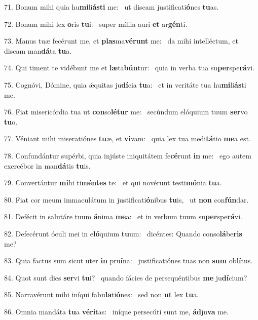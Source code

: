 71. Bonum mihi quia hu\textbf{mi}li\textbf{ás}\textbf{ti} me: \ast\  ut discam justificati\textbf{ó}nes \textbf{tu}as.\

72. Bonum mihi lex \textbf{o}ris \textbf{tu}i: \ast\  super míllia auri \textbf{et} ar\textbf{gén}ti.\

73. Manus tuæ fecérunt me, et \textbf{plas}ma\textbf{vé}\textbf{runt} me: \ast\  da mihi intelléctum, et discam man\textbf{dá}ta \textbf{tu}a.\

74. Qui timent te vidébunt me et \textbf{læ}ta\textbf{bún}tur: \ast\  quia in verba tua su\textbf{per}spe\textbf{rá}vi.\

75. Cognóvi, Dómine, quia ǽquitas ju\textbf{dí}cia \textbf{tu}a: \ast\  et in veritáte tua hu\textbf{mi}li\textbf{ás}ti me.\

76. Fiat misericórdia tua ut \textbf{con}so\textbf{lé}\textbf{tur} me: \ast\  secúndum elóquium tuum \textbf{ser}vo \textbf{tu}o.\

77. Véniant mihi miseratiónes \textbf{tu}æ, et \textbf{vi}vam: \ast\  quia lex tua medi\textbf{tá}tio \textbf{me}a est.\

78. Confundántur supérbi, quia injúste iniquitátem fe\textbf{cé}runt \textbf{in} me: \ast\  ego autem exercébor in man\textbf{dá}tis \textbf{tu}is.\

79. Convertántur \textbf{mi}hi ti\textbf{mén}\textbf{tes} te: \ast\  et qui novérunt testi\textbf{mó}nia \textbf{tu}a.\

80. Fiat cor meum immaculátum in justificati\textbf{ó}nibus \textbf{tu}is, \ast\  ut \textbf{non} con\textbf{fún}dar.\

81. Defécit in salutáre tuum \textbf{á}nima \textbf{me}a: \ast\  et in verbum tuum su\textbf{per}spe\textbf{rá}vi.\

82. Defecérunt óculi mei in e\textbf{ló}quium \textbf{tu}um: \ast\  dicéntes: Quando conso\textbf{lá}be\textbf{ris} me?\

83. Quia factus sum sicut uter \textbf{in} pru\textbf{í}na: \ast\  justificatiónes tuas non \textbf{sum} ob\textbf{lí}tus.\

84. Quot sunt dies \textbf{ser}vi \textbf{tu}i? \ast\  quando fácies de persequéntibus \textbf{me} ju\textbf{dí}cium?\

85. Narravérunt mihi iníqui fabu\textbf{la}ti\textbf{ó}nes: \ast\  sed non \textbf{ut} lex \textbf{tu}a.\

86. Omnia mandáta \textbf{tu}a \textbf{vé}\textbf{ri}tas: \ast\  iníque persecúti sunt me, \textbf{ád}ju\textbf{va} me.\

